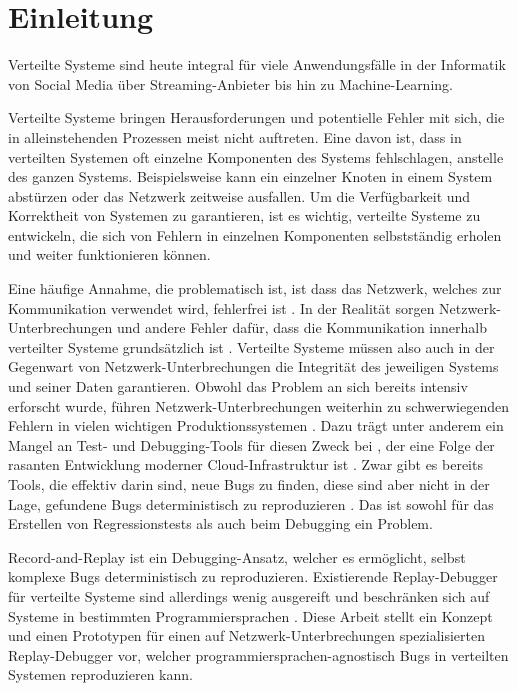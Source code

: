 \documentclass[12pt,a4paper]{report}
\begin{document}
\chapter{Einleitung}
\setcounter{page}{1}
Verteilte Systeme sind heute integral für viele Anwendungsfälle in der Informatik von Social Media über Streaming-Anbieter bis hin
zu Machine-Learning.

Verteilte Systeme bringen Herausforderungen und potentielle Fehler mit sich, die in alleinstehenden Prozessen meist nicht
auftreten. Eine davon ist, dass in verteilten Systemen oft einzelne Komponenten des Systems fehlschlagen, anstelle des ganzen
Systems. Beispielsweise kann ein einzelner Knoten in einem System abstürzen oder das Netzwerk zeitweise ausfallen. Um die
Verfüg\-bar\-keit und Korrektheit von Systemen zu garantieren, ist es wichtig, verteilte Systeme zu entwickeln, die sich von Fehlern
in einzelnen Komponenten selbst\-ständig erholen und weiter funktionieren können. \cite{distributed_systems_book}

Eine häufige Annahme, die problematisch ist, ist dass das Netzwerk, welches zur Kommunikation verwendet wird,
fehlerfrei ist \cite{brief_introduction_to_distributed_systems, the_network_is_reliable}. In der Realität sorgen
Netzwerk-Unterbrechungen und andere Fehler dafür, dass die Kommunikation innerhalb verteilter Systeme grundsätzlich
ist \cite{distributed_systems_book, distributed_systems_concepts_and_design}. Verteilte Systeme müssen also auch in der Gegenwart
von Netzwerk-Unterbrechungen die Integrität des jeweiligen Systems und seiner Daten garantieren. Obwohl das Problem an sich bereits
intensiv erforscht wurde, führen Netzwerk-Unterbrech\-ungen weiterhin zu schwerwiegenden Fehlern in vielen wichtigen
Produktionssystemen \cite{analysis_of_network_partition_failures}. Dazu trägt unter anderem ein Mangel an Test- und
Debugging-Tools für diesen Zweck bei \cite{failify_paper,simple_testing_can_prevent}, der eine Folge der rasanten Entwicklung
moderner Cloud-Infrastruktur ist \cite{why_does_cloud_stop_computing}. Zwar gibt es bereits Tools, die effektiv darin sind, neue
Bugs zu finden, diese sind aber nicht in der Lage, gefundene Bugs deterministisch zu reproduzieren \cite{failify_paper}. Das ist
sowohl für das Erstellen von Regressionstests als auch beim Debugging ein Problem.

Record-and-Replay ist ein Debugging-Ansatz, welcher es ermöglicht, selbst komplexe Bugs deterministisch zu reproduzieren.
Existierende Replay-Debug\-ger für verteilte Systeme sind allerdings wenig ausgereift und beschränken sich auf Systeme in bestimmten
Programmiersprachen \cite{distributed_replay_debugging_1997,distributed_replay_debugging_2006}. Diese Arbeit stellt ein Konzept
und einen Prototypen für einen auf Netzwerk-Unterbrech\-ungen spezialisierten Replay-Debugger vor, welcher
programmiersprachen-agnostisch Bugs in verteilten Systemen reproduzieren kann.
\end{document}
